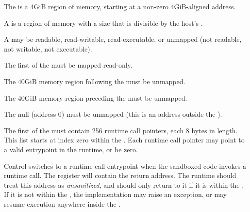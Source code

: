 


\specitem
The  is a 4GiB region of memory, starting at a non-zero 4GiB-aligned address.

\specitem
A  is a region of memory with a size that is divisible by the
host's .


\specitem
\label{specitem:page}
A  may be readable, read-writable, read-executable, or unmapped
(not readable, not writable, not executable).


\specitem
The first  of the  must be mapped read-only.

\specitem
The 40GiB memory region following the  must be unmapped.

\specitem
The 40GiB memory region preceding the  must be unmapped.

\specitem
The null  (address 0) must be unmapped (this is an address outside the ).



\specitem
The first  of the  must contain 256 runtime call pointers, each 8 bytes in length. This list starts at index zero within the . Each runtime call pointer may point to a valid entrypoint in the runtime, or be zero.

\specitem
Control switches to a runtime call entrypoint when the sandboxed code invokes a runtime call. The  register will contain the return address. The runtime should treat this address as \textit{unsanitized}, and should only return to it if it is within the . If it is not within the , the implementation may raise an exception, or may resume execution anywhere inside the .
